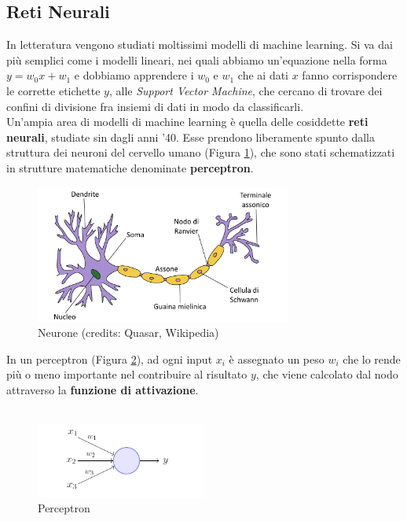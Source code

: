 \subsection*{Reti Neurali} In letteratura vengono studiati moltissimi modelli di machine learning. Si va dai più semplici come i modelli lineari, nei quali abbiamo un'equazione nella forma $y = w_0x + w_1$ e dobbiamo apprendere i $w_0$ e $w_1$ che ai dati $x$ fanno corrispondere le corrette etichette $y$, alle \textit{Support Vector Machine}, che cercano di trovare dei confini di divisione fra insiemi di dati in modo da classificarli.\\
Un'ampia area di modelli di machine learning è quella delle cosiddette \textbf{reti neurali}, studiate sin dagli anni '40. Esse prendono liberamente spunto dalla struttura dei neuroni del cervello umano (Figura \ref{fig:neurone}), che sono stati schematizzati in strutture matematiche denominate \textbf{perceptron}.
\begin{figure}[h]
	\begin{center}
		\includegraphics[width=0.75\textwidth]{img/neurone.png}
		\caption{Neurone (credits: Quasar, Wikipedia)}
		\label{fig:neurone}
	\end{center}
\end{figure}
In un perceptron (Figura \ref{fig:perceptron}), ad ogni input $x_i$ è assegnato un peso $w_i$ che lo rende più o meno importante nel contribuire al risultato $y$, che viene calcolato dal nodo attraverso la \textbf{funzione di attivazione}.\\\\
\begin{figure}[h]
	\begin{center}
		\includegraphics[width=0.5\textwidth]{img/perceptron.png}
		\caption{Perceptron}
		\label{fig:perceptron}
	\end{center}
\end{figure}
